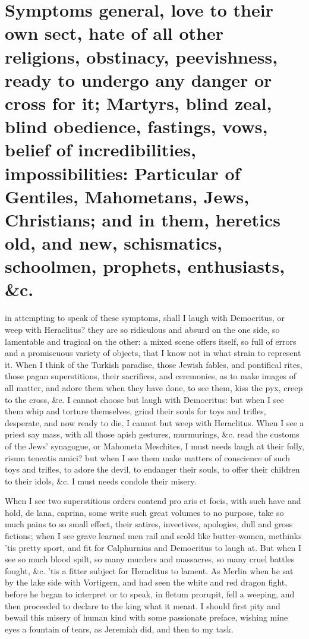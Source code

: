 {%
\section[Symptoms general]{Symptoms general, love to their own sect, hate of all other religions, obstinacy, peevishness, ready to undergo any danger or cross for it; Martyrs, blind zeal, blind obedience, fastings, vows, belief of incredibilities, impossibilities: Particular of Gentiles, Mahometans, Jews, Christians; and in them, heretics old, and new, schismatics, schoolmen, prophets, enthusiasts, \&c.}

 in attempting to speak of these
symptoms, shall I laugh with Democritus, or weep with Heraclitus? they
are so ridiculous and absurd on the one side, so lamentable and
tragical on the other: a mixed scene offers itself, so full of errors
and a promiscuous variety of objects, that I know not in what strain to
represent it. When I think of the Turkish paradise, those Jewish
fables, and pontifical rites, those pagan superstitions, their
sacrifices, and ceremonies, as to make images of all matter, and adore
them when they have done, to see them, kiss the pyx, creep to the
cross, \&c. I cannot choose but laugh with Democritus: but when I see
them whip and torture themselves, grind their souls for toys and
trifles, desperate, and now ready to die, I cannot but weep with
Heraclitus. When I see a priest say mass, with all those apish
gestures, murmurings, \&c. read the customs of the Jews' synagogue, or
Mahometa Meschites, I must needs laugh at their folly, risum
teneatis amici? but when I see them make matters of conscience of such
toys and trifles, to adore the devil, to endanger their souls, to offer
their children to their idols, \&c. I must needs condole their misery.

When I see two superstitious orders contend pro aris et focis, with
such have and hold, de lana, caprina, some write such great volumes to
no purpose, take so much pains to so small effect, their satires,
invectives, apologies, dull and gross fictions; when I see grave
learned men rail and scold like butter-women, methinks 'tis pretty
sport, and fit for Calphurnius and Democritus to laugh at. But
when I see so much blood spilt, so many murders and massacres, so many
cruel battles fought, \&c. 'tis a fitter subject for Heraclitus to
lament. As Merlin when he sat by the lake side with Vortigern,
and had seen the white and red dragon fight, before he began to
interpret or to speak, in fletum prorupit, fell a weeping, and then
proceeded to declare to the king what it meant. I should first pity and
bewail this misery of human kind with some passionate preface, wishing
mine eyes a fountain of tears, as Jeremiah did, and then to my task.

}
